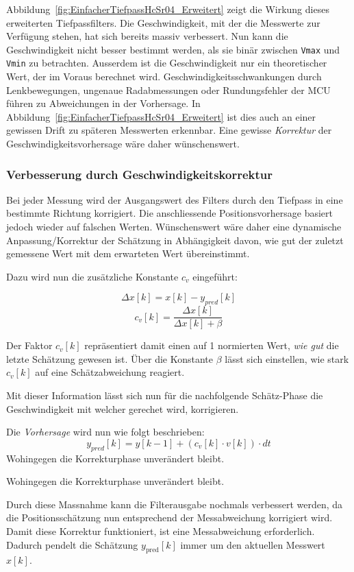 \documentclass[main.tex]{subfiles} %
\begin{document}
Abbildung~\ref{fig:EinfacherTiefpassHcSr04_Erweitert} zeigt die Wirkung dieses
erweiterten Tiefpassfilters. Die Geschwindigkeit, mit der die Messwerte zur
Verfügung stehen, hat sich bereits massiv verbessert. Nun kann die
Geschwindigkeit nicht besser bestimmt werden, als sie binär zwischen
\texttt{Vmax} und \texttt{Vmin} zu betrachten. Ausserdem ist die
Geschwindigkeit nur ein theoretischer Wert, der im Voraus berechnet wird.
Geschwindigkeitsschwankungen durch Lenkbewegungen, ungenaue Radabmessungen oder
Rundungsfehler der MCU führen zu Abweichungen in der Vorhersage. In
Abbildung~\ref{fig:EinfacherTiefpassHcSr04_Erweitert} ist dies auch an einer
gewissen Drift zu späteren Messwerten erkennbar. Eine gewisse
\textit{Korrektur} der Geschwindigkeitsvorhersage wäre daher wünschenswert.

\subsubsection*{Verbesserung durch Geschwindigkeitskorrektur}

Bei jeder Messung wird der Ausgangswert des Filters durch den Tiefpass in eine
bestimmte Richtung korrigiert. Die anschliessende Positionsvorhersage basiert
jedoch wieder auf falschen Werten. Wünschenswert wäre daher eine dynamische
Anpassung/Korrektur der Schätzung in Abhängigkeit davon, wie gut der zuletzt
gemessene Wert mit dem erwarteten Wert übereinstimmt.

Dazu wird nun die zusätzliche Konstante $c_v$ eingeführt:

\[
    \Delta x[k] = x[k] - y_{pred}[k]
\]
\[
    c_v[k] = \frac{\Delta x[k]}{\Delta x[k] + \beta}
\]

Der Faktor $c_v[k]$ repräsentiert damit einen auf 1 normierten Wert,
\textit{wie gut} die letzte Schätzung gewesen ist. Über die Konstante $\beta$
lässt sich einstellen, wie stark $c_v[k]$ auf eine Schätzabweichung reagiert.

Mit dieser Information lässt sich nun für die nachfolgende Schätz-Phase die
Geschwindigkeit mit welcher gerechet wird, korrigieren.

Die \textit{Vorhersage} wird nun wie folgt beschrieben:
\[
    y_{pred}[k] = y[k - 1] + (c_v[k] \cdot v[k]) \cdot dt
\]
Wohingegen die Korrekturphase unverändert bleibt.

Wohingegen die Korrekturphase unverändert bleibt.

Durch diese Massnahme kann die Filterausgabe nochmals verbessert werden, da die
Positionsschätzung nun entsprechend der Messabweichung korrigiert wird. Damit
diese Korrektur funktioniert, ist eine Messabweichung erforderlich. Dadurch
pendelt die Schätzung $y_{\text{pred}}[k]$ immer um den aktuellen Messwert
$x[k]$.
\end{document}
